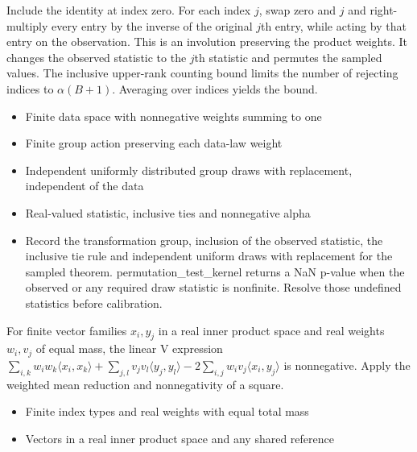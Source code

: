 \expandafter\def\csname statadic@proof@STATADIC-RANDOMIZATION-002\endcsname{Include the identity at index zero. For each index $j$, swap
  zero and $j$ and right-multiply every entry by the inverse of the original
  $j$th entry, while acting by that entry on the observation. This is an
  involution preserving the product weights. It changes the observed statistic
  to the $j$th statistic and permutes the sampled values. The inclusive
  upper-rank counting bound limits the number of rejecting indices to
  $\alpha(B+1)$. Averaging over indices yields the bound.}
\expandafter\def\csname statadic@assumptions@STATADIC-RANDOMIZATION-002\endcsname{\begin{itemize}
\item Finite data space with nonnegative weights summing to one
\item Finite group action preserving each data-law weight
\item Independent uniformly distributed group draws with replacement, independent of the data
\item Real-valued statistic, inclusive ties and nonnegative alpha
\end{itemize}}
\expandafter\def\csname statadic@diagnostics@STATADIC-RANDOMIZATION-002\endcsname{\begin{itemize}
\item Record the transformation group, inclusion of the observed statistic, the inclusive tie rule and independent uniform draws with replacement for the sampled theorem. permutation\_test\_kernel returns a NaN p-value when the observed or any required draw statistic is nonfinite. Resolve those undefined statistics before calibration.
\end{itemize}}
\expandafter\def\csname statadic@statement@STATADIC-MMD-003\endcsname{For finite vector families $x_i,y_j$ in a real inner product
  space and real weights $w_i,v_j$ of equal mass, the linear V expression
  $\sum_{i,k}w_iw_k\langle x_i,x_k\rangle+\sum_{j,l}v_jv_l\langle y_j,y_l\rangle-2\sum_{i,j}w_iv_j\langle x_i,y_j\rangle$ is nonnegative.}
\expandafter\def\csname statadic@proof@STATADIC-MMD-003\endcsname{Apply the weighted mean reduction and nonnegativity of a square.}
\expandafter\def\csname statadic@assumptions@STATADIC-MMD-003\endcsname{\begin{itemize}
\item Finite index types and real weights with equal total mass
\item Vectors in a real inner product space and any shared reference
\end{itemize}}
